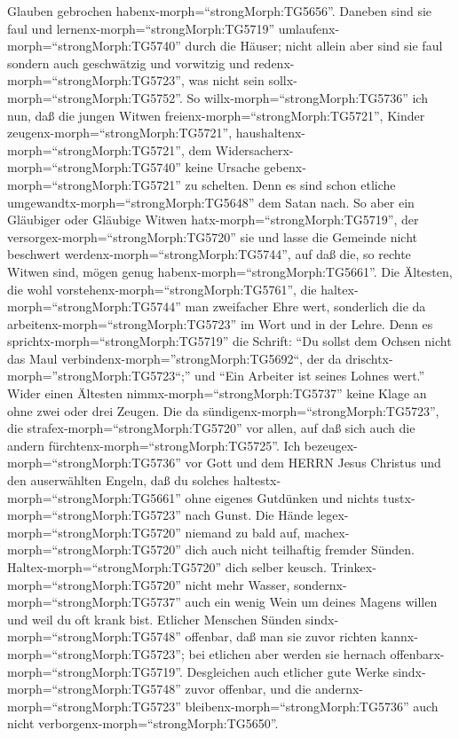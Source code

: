 Glauben gebrochen habenx-morph=``strongMorph:TG5656''. 
Daneben sind sie faul und lernenx-morph=``strongMorph:TG5719''
umlaufenx-morph=``strongMorph:TG5740'' durch die Häuser; nicht allein
aber sind sie faul sondern auch geschwätzig und vorwitzig und
redenx-morph=``strongMorph:TG5723'', was nicht sein
sollx-morph=``strongMorph:TG5752''.  So
willx-morph=``strongMorph:TG5736'' ich nun, daß die jungen Witwen
freienx-morph=``strongMorph:TG5721'', Kinder
zeugenx-morph=``strongMorph:TG5721'',
haushaltenx-morph=``strongMorph:TG5721'', dem
Widersacherx-morph=``strongMorph:TG5740'' keine Ursache
gebenx-morph=``strongMorph:TG5721'' zu schelten.  Denn es
sind schon etliche umgewandtx-morph=``strongMorph:TG5648'' dem Satan
nach.  So aber ein Gläubiger oder Gläubige Witwen
hatx-morph=``strongMorph:TG5719'', der
versorgex-morph=``strongMorph:TG5720'' sie und lasse die Gemeinde nicht
beschwert werdenx-morph=``strongMorph:TG5744'', auf daß die, so rechte
Witwen sind, mögen genug habenx-morph=``strongMorph:TG5661''.
 Die Ältesten, die wohl
vorstehenx-morph=``strongMorph:TG5761'', die
haltex-morph=``strongMorph:TG5744'' man zweifacher Ehre wert, sonderlich
die da arbeitenx-morph=``strongMorph:TG5723'' im Wort und in der Lehre.
 Denn es sprichtx-morph=``strongMorph:TG5719'' die Schrift:
``Du sollst dem Ochsen nicht das Maul
verbindenx-morph=''strongMorph:TG5692``, der da
drischtx-morph=''strongMorph:TG5723``;'' und ``Ein Arbeiter ist seines
Lohnes wert.''  Wider einen Ältesten
nimmx-morph=``strongMorph:TG5737'' keine Klage an ohne zwei oder drei
Zeugen.  Die da sündigenx-morph=``strongMorph:TG5723'', die
strafex-morph=``strongMorph:TG5720'' vor allen, auf daß sich auch die
andern fürchtenx-morph=``strongMorph:TG5725''.  Ich
bezeugex-morph=``strongMorph:TG5736'' vor Gott und dem HERRN Jesus
Christus und den auserwählten Engeln, daß du solches
haltestx-morph=``strongMorph:TG5661'' ohne eigenes Gutdünken und nichts
tustx-morph=``strongMorph:TG5723'' nach Gunst.  Die Hände
legex-morph=``strongMorph:TG5720'' niemand zu bald auf,
machex-morph=``strongMorph:TG5720'' dich auch nicht teilhaftig fremder
Sünden. Haltex-morph=``strongMorph:TG5720'' dich selber keusch.
 Trinkex-morph=``strongMorph:TG5720'' nicht mehr Wasser,
sondernx-morph=``strongMorph:TG5737'' auch ein wenig Wein um deines
Magens willen und weil du oft krank bist.  Etlicher
Menschen Sünden sindx-morph=``strongMorph:TG5748'' offenbar, daß man sie
zuvor richten kannx-morph=``strongMorph:TG5723''; bei etlichen aber
werden sie hernach offenbarx-morph=``strongMorph:TG5719''. 
Desgleichen auch etlicher gute Werke sindx-morph=``strongMorph:TG5748''
zuvor offenbar, und die andernx-morph=``strongMorph:TG5723''
bleibenx-morph=``strongMorph:TG5736'' auch nicht
verborgenx-morph=``strongMorph:TG5650''.


